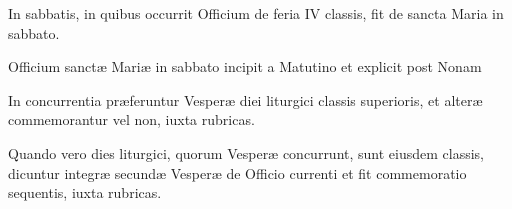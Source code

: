 \documentclass[vesperale_romanum.tex]{subfiles}
\begin{document}

In sabbatis, in quibus occurrit Officium de feria IV classis, fit de sancta Maria in sabbato.

Officium sanctæ Mariæ in sabbato incipit a Matutino et explicit post Nonam

 
In concurrentia præferuntur Vesperæ diei liturgici classis superioris, et alteræ commemorantur vel non, iuxta rubricas.

Quando vero dies liturgici, quorum Vesperæ concurrunt, sunt eiusdem classis, dicuntur integræ secundæ Vesperæ de Officio currenti et fit commemoratio sequentis, iuxta rubricas.

\end{document}
